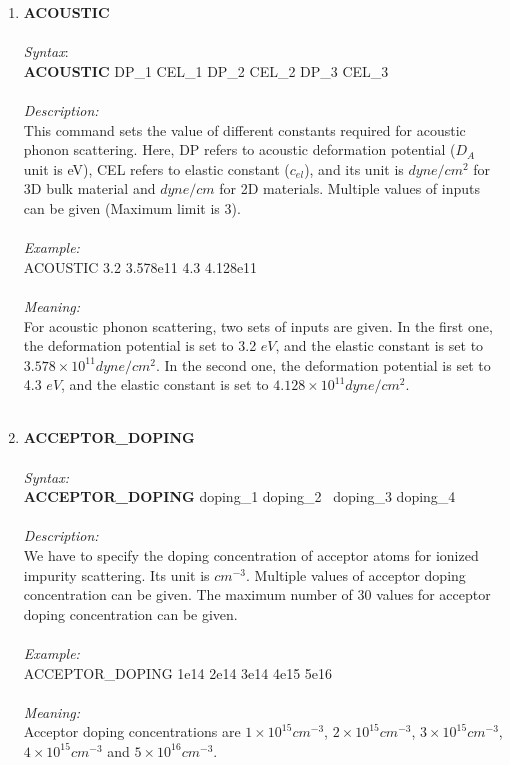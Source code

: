 \documentclass[12pt]{article}
\begin{document}
\begin{enumerate}
    \item \textbf{ACOUSTIC} \\ \\
    \textit{Syntax}: \\
    \textbf{ACOUSTIC} DP\_1 CEL\_1 DP\_2 CEL\_2 DP\_3 CEL\_3  \\ \\
    \textit{Description:} \\
    This command sets the value of different constants required for acoustic phonon scattering. Here, DP refers to acoustic deformation potential ($D_A$ unit is eV), CEL refers to elastic constant ($c_{el}$), and its unit is $dyne/cm^2$ for 3D bulk material and $dyne/cm$ for 2D materials. Multiple values of inputs can be given (Maximum limit is 3). \\ \\ 
    \textit{Example:}\\
    ACOUSTIC 3.2 3.578e11 4.3 4.128e11 \\ \\
    \textit{Meaning:}\\
    For acoustic phonon scattering, two sets of inputs are given. In the first one, the deformation potential is set to 3.2 $eV$, and the elastic constant is set to $3.578 \times 10^{11} dyne/cm^2 $. In the second one, the deformation potential is set to 4.3 $eV$, and the elastic constant is set to $4.128 \times 10^{11} dyne/cm^2 $. \\ \\
    
    \item \textbf{ACCEPTOR\_DOPING}\\ \\
    \textit{Syntax:} \\
    \textbf{ACCEPTOR\_DOPING} doping\_1 doping\_2 \ doping\_3 doping\_4 \\ \\
    \textit{Description:} \\
    We have to specify the doping concentration of acceptor atoms for ionized impurity scattering. Its unit is $cm^{-3}$. Multiple values of acceptor doping concentration can be given. The maximum number of 30 values for acceptor doping concentration can be given. \\ \\
    \textit{Example:} \\
    ACCEPTOR\_DOPING 1e14 2e14 3e14 4e15 5e16 \\ \\
    \textit{Meaning:} \\ 
    Acceptor doping concentrations are $1 \times 10^{15} cm^{-3}$, $2 \times 10^{15} cm^{-3}$, $3 \times 10^{15} cm^{-3}$, $4 \times 10^{15} cm^{-3}$ and $5 \times 10^{16} cm^{-3}$. \\ \\


\end{enumerate}
\end{document}
